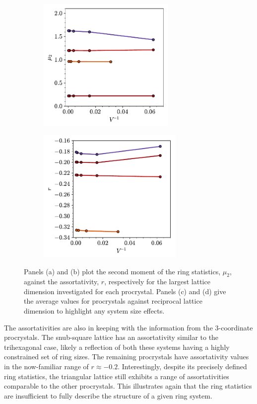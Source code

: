 \begin{figure}[bt]
     \vspace{2mm}
     \begin{subfigure}[b]{0.45\textwidth}
         \centering
         \includegraphics[height=6.5cm]{./figures/procrystals/pro45_ss_mu2_.pdf}
         \caption{}
         \label{fig:pro45p6ssmu2}
     \end{subfigure}
     \hspace{1cm}
        \begin{subfigure}[b]{0.45\textwidth}
         \centering
         \includegraphics[height=6.5cm]{./figures/procrystals/pro45_ss_r_.pdf}
         \caption{}
         \label{fig:pro45p6ssr}
     \end{subfigure}
     
     \caption{Panels (a) and (b) plot the second moment of the ring statistics, $\mu_2$, against the assortativity, $r$, respectively for the largest lattice dimension investigated for each procrystal. Panels (c) and (d) give the average values for procrystals against reciprocal lattice dimension to highlight any system size effects.}
     \label{fig:pro45p6mu2r}
\end{figure}

The assortativities are also in keeping with the information from the 3\--coordinate procrystals.
The snub\--square lattice has an assortativity similar to the trihexagonal case, likely a reflection of both these systems having a highly constrained set of ring sizes.
The remaining procrystals have assortativity values in the now\--familiar range of $r\approx-0.2$.
Interestingly, despite its precisely defined ring statistics, the triangular lattice still exhibits a range of assortativities comparable to the other procrystals.
This illustrates again that the ring statistics are insufficient to fully describe the structure of a given ring system.


